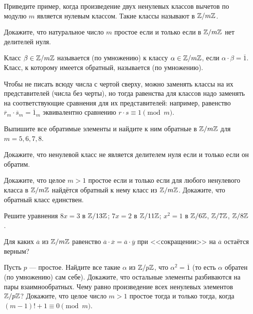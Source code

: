 \documentclass[a4paper, 12pt]{article}
\newcommand{\ov}{\overline}
\newcommand{\Zm}[1]{\Z/ {#1}\Z}
\begin{document}


 Приведите пример, когда произведение двух ненулевых классов
вычетов по модулю $m$ является нулевым классом. Такие классы
называют  в $\Zm{m}$. 

 Докажите, что натуральное число $m$ простое если и только если
в $\Zm{m}$ нет делителей нуля. 

 Класс $\beta\in\Zm{m}$ называется   (по умножению) к классу $\alpha\in\Zm{m}$, если $\alpha\cdot \beta = \ov{1}$.
Класс, к которому имеется обратный, называется  (по умножению).

{\small
{} Чтобы не писать всюду числа с чертой сверху, можно заменять классы на их представителей (числа без черты), но тогда равенства для классов надо заменять на соответствующие сравнения для их представителей: например, равенство $\ov{r}_m\cdot\ov{s}_m = \ov{1}_m$ эквивалентно сравнению $r\cdot s \equiv 1\!\pmod{m}$.
}

  Выпишите все обратимые элементы и найдите к ним обратные в $\Zm{m}$ для $m=5,6,7,8$.

Докажите, что ненулевой класс не является делителем нуля если и только если он обратим.

  Докажите, что целое $m > 1$ простое если и только если
для любого ненулевого класса в $\Zm{m}$ найдётся обратный к нему класс из $\Zm{m}$.
 Докажите, что обратный класс единствен.

 Решите уравнения %
 $ 8x = 3$ в $\Zm{13}$;  $7x = 2$ в $\Zm{11}$;  $x^2=1$ в  $\Zm{6}$,  $\Zm{7}$,  $\Zm{8}$.


Для каких $\ov{a}$ из $\Zm{m}$ равенство $\ov{a}\cdot\ov{x}=\ov{a}\cdot\ov{y}$ при <<сокращении>> на $\ov{a}$ остаётся верным?


\label{Z:Wils} %
Пусть $p$ --- простое.
 Найдите все такие $\alpha$ из $\Zm{p}$, что $\alpha^2=\ov{1}$
(то есть $\alpha$ обратен (по умножению) сам себе).
 Докажите, что остальные элементы разбиваются на пары взаимнообратных.
\label{P:pr} Чему равно произведение всех ненулевых элементов $\Zm{p}$?
\пункт[Критерий Вильсона]
Докажите, что целое число $m>1$ простое тогда и только тогда, когда $(m-1)!+1\equiv0\!\pmod{m}$.
\end{document}
